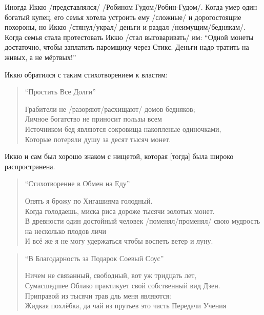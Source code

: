 \begin{ver}
Иногда Иккю /представлялся/ /Робином Гудом/Робин-Гудом/. Когда умер
один богатый купец, его семья хотела устроить ему
/сложные/ и дорогостоящие похороны, но Иккю
/стянул/украл/ деньги и раздал /неимущим/беднякам/.
Когда семья стала протестовать Иккю /стал
выговаривать/ им: ``Одной монеты достаточно, чтобы
заплатить паромщику через Стикс. Деньги надо тратить на живых, а не мёртвых!''
\end{ver}

\begin{ver}
  Иккю обратился с таким стихотворением к властям:
  \begin{verse}\it
    \centerline{``Простить Все Долги''}
    Грабители не /разоряют/расхищают/ домов бедняков;\\
    Личное богатство не  приносит пользы всем\\
    Источником бед являются сокровища накопленые
    одиночками,\\
    Которые потеряли душу за десят тысяч монет.
  \end{verse}
\end{ver}

\begin{ver}
  Иккю и сам был хорошо знаком с нищетой, которая [тогда] была широко
  распространена. 
\end{ver}

\begin{ver}
  \begin{verse}\it
    \centerline{``Стихотворение в Обмен на Еду''}
    Опять я брожу по Хигашияма голодный.\\
    Когда голодаешь, миска риса дороже тысячи золотых монет.\\
    В древности один достойный человек /поменял/променял/ свою
    мудрость на несколько плодов личи\\
    И всё же я не могу удержаться чтобы воспеть ветер и луну.\\
  \end{verse}
\end{ver}

\begin{ver}
  \begin{verse}\it
    \centerline{``В Благодарность за Подарок Соевый Соус''}
    Ничем не связанный, свободный, вот уж тридцать лет,\\
    Сумасшедшее Облако практикует свой собственный вид Дзен.\\
    Приправой из тысячи трав дль меня являются:\\
    Жидкая похлёбка, да чай из прутьев это часть Передачи Учения\\
  \end{verse}
\end{ver}

